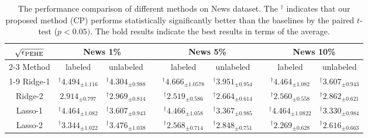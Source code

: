 \begin{table}[tbp]
\caption{The performance comparison of different methods on News dataset. The $^\dagger$ indicates that our proposed method (CP) performs statistically significantly better than the baselines by the paired $t$-test ($p<0.05)$. The bold results indicate the best results in terms of the average.}\label{table:news}
{
\centering

\begin{tabular} {ccccccccc }

\toprule[2pt]
          $ \sqrt{\epsilon_{\rm PEHE}} $         & \multicolumn{2}{c}{ \bf{News} 1\%}        &              & \multicolumn{2}{c}{\bf{News} 5\%}& &  \multicolumn{2}{c}{\bf{News} 10\%}      \\[3pt]\cmidrule{2-3}\cmidrule{5-6}\cmidrule{8-9}
Method                      & labeled  & unlabeled & \multicolumn{1}{l}{} & labeled & unlabeled & \multicolumn{1}{l}{} & labeled & unlabeled\\[3pt] \cmidrule{1-9}
Ridge-1   &  $^\dagger4.494_{\pm{1.116}}$  &   $^\dagger4.304_{\pm{0.988}}$         & \multicolumn{1}{l}{} &  $^\dagger4.666_{\pm{1.0578}}$ &  $^\dagger3.951_{\pm{0.954}}$ &   & $^\dagger4.464_{\pm{1.082}}$   & $^\dagger3.607_{\pm{0.943}}$      \\[3pt]
Ridge-2   &  $2.914_{\pm{0.797}}$ &  $^\dagger2.969_{\pm{0.814}}$  & \multicolumn{1}{l}{} & $^\dagger2.519_{\pm{0.586}}$ & $^\dagger2.664_{\pm{0.614}}$ &  & $^\dagger2.560_{\pm{0.558}}$ & $^\dagger2.862_{\pm{0.621}}$      \\[3pt]

Lasso-1   &        $^\dagger4.464_{\pm{1.082}}$   &   $^\dagger3.607_{\pm{0.943}}$   & \multicolumn{1}{l}{} &    $^\dagger4.466_{\pm{1.058}}$    &     $^\dagger3.367_{\pm{0.985}}$    &  &   $^\dagger4.464_{\pm{1.0822}}$& $^\dagger3.330_{\pm{0.984}}$      \\[3pt]
Lasso-2   &        $^\dagger3.344_{\pm{1.022}}$   &   $^\dagger3.476_{\pm{1.038}}$   & \multicolumn{1}{l}{} &    $^\dagger2.568_{\pm{0.714}}$   &  $^\dagger2.848_{\pm{0.751}}$ &  &  $^\dagger2.269_{\pm{0.628}}$  &  $^\dagger2.616_{\pm{0.663}}$      \\[3pt]


\end{tabular}}
\end{table}
